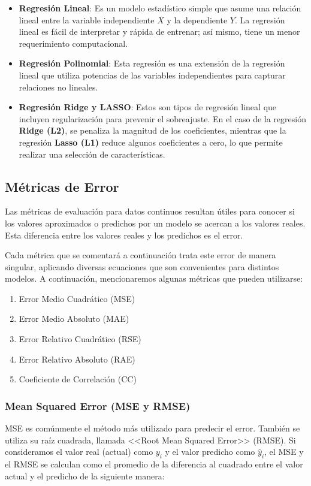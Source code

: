 \documentclass[12pt]{article}
\begin{document}
\begin{itemize}
    \item \textbf{Regresión Lineal}: Es un modelo estadístico simple que asume una relación lineal entre la variable independiente $X$ y la dependiente $Y$. La regresión lineal es fácil de interpretar y rápida de entrenar; así mismo, tiene un menor requerimiento computacional.
    \item \textbf{Regresión Polinomial}: Esta regresión es una extensión de la regresión lineal que utiliza potencias de las variables independientes para capturar relaciones no lineales.
    \item \textbf{Regresión Ridge y LASSO}: Estos son tipos de regresión lineal que incluyen regularización para prevenir el sobreajuste. En el caso de la regresión \textbf{Ridge (L2)}, se penaliza la magnitud de los coeficientes, mientras que la regresión \textbf{Lasso (L1)} reduce algunos coeficientes a cero, lo que permite realizar una selección de características.
\end{itemize}

\cite{De0a100enIA_2}

\subsection{Métricas de Error}
Las métricas de evaluación para datos continuos resultan útiles para conocer si los valores aproximados o predichos por un modelo se acercan a los valores reales. Esta diferencia entre los valores reales y los predichos es el error. 

Cada métrica que se comentará a continuación trata este error de manera singular, aplicando diversas ecuaciones que son convenientes para distintos modelos. A continuación, mencionaremos algunas métricas que pueden utilizarse:
\begin{enumerate}
    \item Error Medio Cuadrático (MSE)
    \item Error Medio Absoluto (MAE)
    \item Error Relativo Cuadrático (RSE)
    \item Error Relativo Absoluto (RAE)
    \item Coeficiente de Correlación (CC)
\end{enumerate}
\cite{De0a100enIA}

\subsubsection{Mean Squared Error (MSE y RMSE)}
MSE es comúnmente el método más utilizado para predecir el error. También se utiliza su raíz cuadrada, llamada <<Root Mean Squared Error>> (RMSE). 
Si consideramos el valor real (actual) como $y_i$ y el valor predicho como $\hat{y}_i$, el MSE y el RMSE se calculan como el promedio de la diferencia al cuadrado entre el valor actual y el predicho de la siguiente manera:
\end{document}
